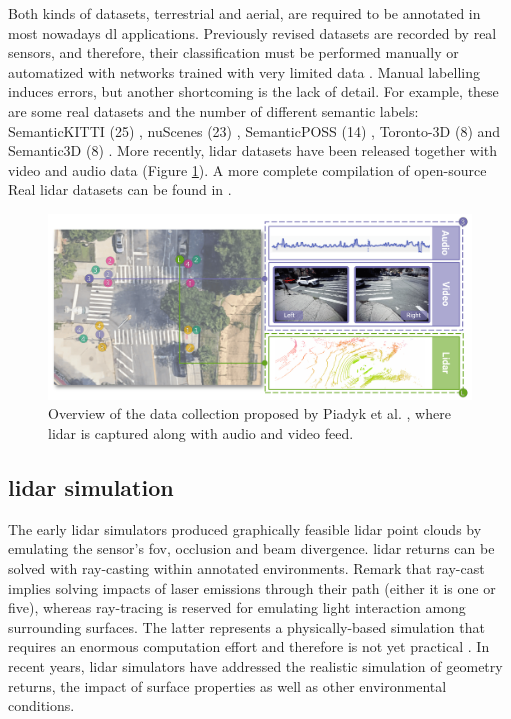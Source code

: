 Both kinds of datasets, terrestrial and aerial, are required to be annotated in most nowadays \acrshort{dl} applications. Previously revised datasets are recorded by real sensors, and therefore, their classification must be performed manually \cite{behley_towards_2021, pan_semanticposs_2020, tan_toronto-3d_2020} or automatized with networks trained with very limited data \cite{wu_squeezesegv2_2019}. Manual labelling induces errors, but another shortcoming is the lack of detail. For example, these are some real datasets and the number of different semantic labels: SemanticKITTI (25) \cite{behley_towards_2021}, nuScenes (23) \cite{caesar_nuscenes_2020}, SemanticPOSS (14) \cite{pan_semanticposs_2020}, Toronto-3D (8) \cite{tan_toronto-3d_2020} and Semantic3D (8) \cite{hackel_semantic3d_2017}. More recently, \acrshort{lidar} datasets have been released together with video and audio data \cite{piadyk_streetaware_2023} (Figure \ref{fig:lidar_audio_video}). A more complete compilation of open-source Real \acrshort{lidar} datasets can be found in \cite{cai_survey_2022}. 

\begin{figure}[ht]
	\includegraphics[width=\linewidth]{figs/context/lidar_dataset_audio_video.png}
	\caption{Overview of the data collection proposed by Piadyk et al. \cite{piadyk_streetaware_2023}, where \acrshort{lidar} is captured along with audio and video feed. }
    \label{fig:lidar_audio_video}
\end{figure}

\subsection{\acrshort{lidar} simulation}

The early \acrshort{lidar} simulators produced graphically feasible \acrshort{lidar} point clouds \cite{gschwandtner_blensor_2011} by emulating the sensor's \acrshort{fov}, occlusion and beam divergence. \acrshort{lidar} returns can be solved with ray-casting \cite{ahn_real-time_2020, zhao_method_2021, bechtold_helios_2016} within annotated environments. Remark that ray-cast implies solving impacts of laser emissions through their path (either it is one or five), whereas ray-tracing is reserved for emulating light interaction among surrounding surfaces. The latter represents a physically-based simulation that requires an enormous computation effort and therefore is not yet practical \cite{ahn_real-time_2020}. In recent years, \acrshort{lidar} simulators have addressed the realistic simulation of geometry returns, the impact of surface properties as well as other environmental conditions. 

